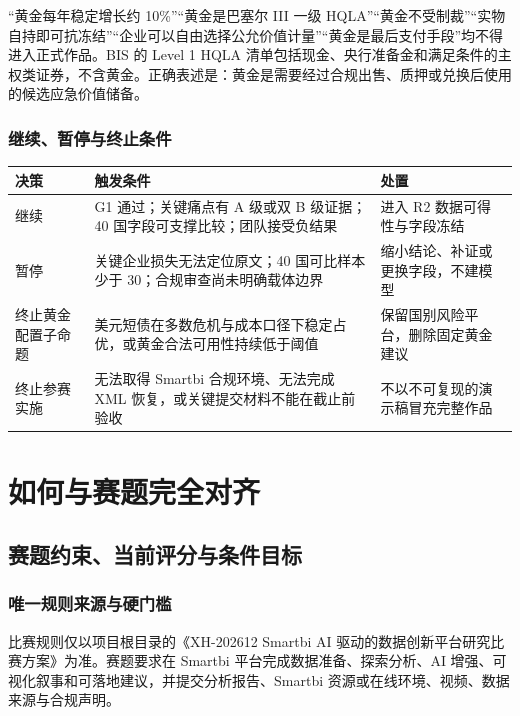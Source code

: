 \documentclass[UTF8,12pt,openany]{ctexbook}
\begin{document}
\begin{cautionbox}[必须删除的表述]
“黄金每年稳定增长约 10\%”“黄金是巴塞尔 III 一级 HQLA”“黄金不受制裁”“实物自持即可抗冻结”“企业可以自由选择公允价值计量”“黄金是最后支付手段”均不得进入正式作品。BIS 的 Level 1 HQLA 清单包括现金、央行准备金和满足条件的主权类证券，不含黄金\autocite[17--18]{bislcr2013}。正确表述是：黄金是需要经过合规出售、质押或兑换后使用的候选应急价值储备。
\end{cautionbox}

\section{继续、暂停与终止条件}
\begin{longtable}{p{2.2cm}p{5.5cm}p{5.8cm}}
\toprule
\textbf{决策} & \textbf{触发条件} & \textbf{处置}\\
\midrule
继续 & G1 通过；关键痛点有 A 级或双 B 级证据；40 国字段可支撑比较；团队接受负结果 & 进入 R2 数据可得性与字段冻结\\
暂停 & 关键企业损失无法定位原文；40 国可比样本少于 30；合规审查尚未明确载体边界 & 缩小结论、补证或更换字段，不建模型\\
终止黄金配置子命题 & 美元短债在多数危机与成本口径下稳定占优，或黄金合法可用性持续低于阈值 & 保留国别风险平台，删除固定黄金建议\\
终止参赛实施 & 无法取得 Smartbi 合规环境、无法完成 XML 恢复，或关键提交材料不能在截止前验收 & 不以不可复现的演示稿冒充完整作品\\
\bottomrule
\end{longtable}

\part{如何与赛题完全对齐}

\chapter{赛题约束、当前评分与条件目标}

\section{唯一规则来源与硬门槛}
比赛规则仅以项目根目录的《XH-202612 Smartbi AI 驱动的数据创新平台研究比赛方案》为准\autocite{competition2026}。赛题要求在 Smartbi 平台完成数据准备、探索分析、AI 增强、可视化叙事和可落地建议，并提交分析报告、Smartbi 资源或在线环境、视频、数据来源与合规声明。
\end{document}
